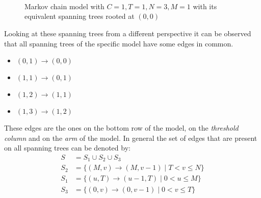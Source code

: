 \begin{figure}[H]
    \centering
    \scalebox{0.8}{
        }
        \vspace{0.8cm} \\
    \scalebox{0.6}{
        }
        \hspace{0.7cm}
    \scalebox{0.6}{
        }
        \vspace{0.4cm} \\
    \scalebox{0.6}{
        }
        \hspace{0.7cm}
    \scalebox{0.6}{
        }
        \vspace{0.4cm} \\
    \scalebox{0.6}{
        }
    \caption{Markov chain model with \(C=1, T=1, N=3, M=1\) with its
    equivalent spanning trees rooted at \((0,0)\)}
    \label{fig:example_spanning_trees_1131}
\end{figure}

Looking at these spanning trees from a different perspective it can be observed
that all spanning trees of the specific model have some edges in common.

\scriptsize
\begin{multicols}{4}
    \begin{itemize}
        \item \((0,1) \rightarrow (0,0)\)
        \item \((1,1) \rightarrow (0,1)\)
        \item \((1,2) \rightarrow (1,1)\)
        \item \((1,3) \rightarrow (1,2)\)
    \end{itemize}
\end{multicols}
\normalsize

These edges are the ones on the bottom row of the model, on the
\textit{threshold column} and on the \textit{arm} of the model.
In general the set of edges that are present on all spanning trees can be
denoted by:
\begin{align} \label{eq:common_edges_set}
    S &= S_1 \cup S_2 \cup S_3 \nonumber\\
    S_2 &= \{(M,v) \rightarrow (M,v-1) \; | \; T < v \leq N\} \nonumber \\
    S_1 &= \{(u,T) \rightarrow (u-1,T) \; | \; 0 < u \leq M\} \nonumber \\
    S_3 &= \{(0,v) \rightarrow (0,v-1) \; | \; 0 < v \leq T\} \nonumber \\
\end{align}

